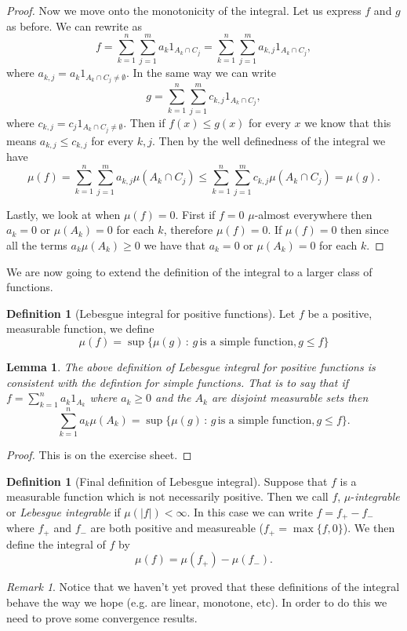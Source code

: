 \documentclass[11pt]{article}
\newtheorem{lem}[thm]{Lemma}
\theoremstyle{definition}
\newtheorem{dfn}[thm]{Definition}
\theoremstyle{remark}
\newtheorem{remark}[thm]{Remark}
\begin{document}
\begin{proof}
Now we move onto the monotonicity of the integral. Let us express $f$ and $g$ as before. We can rewrite as
\[ f = \sum_{k=1}^n \sum_{j=1}^m a_k 1_{A_k \cap C_j} = \sum_{k=1}^n \sum_{j=1}^m a_{k,j}1_{A_k \cap C_j},\] where $a_{k,j} = a_k 1_{A_k \cap C_j \neq \emptyset}$. In the same way we can write
\[ g = \sum_{k=1}^n \sum_{j=1}^m c_{k,j}1_{A_k \cap C_j}, \] where $c_{k,j} = c_j 1_{A_k \cap C_j \neq \emptyset}$. Then if $f(x) \leq g(x)$ for every $x$ we know that this means $a_{k,j} \leq c_{k,j}$ for every $k,j$. Then by the well definedness of the integral we have
\[ \mu(f) = \sum_{k=1}^n \sum_{j=1}^m a_{k,j} \mu(A_k \cap C_j) \leq \sum_{k=1}^n \sum_{j=1}^m c_{k,j} \mu(A_k \cap C_j) = \mu(g).\]

Lastly, we look at when $\mu(f)=0$. First if $f=0$ $\mu$-almost everywhere then $a_k=0$ or $\mu(A_k)=0$ for each $k$, therefore $\mu(f)=0$. If $\mu(f) =0$ then since all the terms $a_k \mu(A_k) \geq 0$ we have that $a_k=0$ or $\mu(A_k) =0$ for each $k$.
\end{proof}

We are now going to extend the definition of the integral to a larger class of functions.
\begin{dfn}[Lebesgue integral for positive functions]
Let $f$ be a positive, measurable function, we define
\[ \mu(f) = \sup \{ \mu(g)\, :\, g \, \mbox{is a simple function}, g \leq f\} \]
\end{dfn}

\begin{lem}
The above definition of Lebesgue integral for positive functions is consistent with the defintion for simple functions. That is to say that if $f = \sum_{k=1}^n a_k 1_{A_k}$ where $a_k \geq 0$ and the $A_k$ are disjoint measurable sets then 
\[ \sum_{k=1}^n a_k \mu(A_k) = \sup \{ \mu(g)\, :\, g \, \mbox{is a simple function}, g \leq f\}.  \] 
\end{lem}
\begin{proof}
This is on the exercise sheet.
\end{proof}

\begin{dfn}[Final definition of Lebesgue integral]
Suppose that $f$ is a measurable function which is not necessarily positive. Then we call $f$, $\mu$-\emph{integrable} or \emph{Lebesgue integrable} if $\mu(|f|)< \infty$. In this case we can write $f = f_+ - f_{-}$ where $f_+$ and $f_-$ are both positive and measureable ($f_+ = \max\{f,  0\}$). We then define the integral of $f$ by
\[ \mu(f) = \mu(f_+) - \mu(f_-). \]
\end{dfn}
\begin{remark}
Notice that we haven't yet proved that these definitions of the integral behave the way we hope (e.g. are linear, monotone, etc). In order to do this we need to prove some convergence results.
\end{remark}
\end{document}
